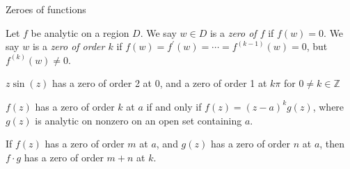 \documentclass{beamer}
\newcommand{\Z}{\mathbb{Z}}
\begin{document}
\begin{frame}{Zeroes of functions}
\begin{definition} Let $f$ be analytic on a region $D$.  We say $w\in D$ is a \emph{zero of $f$} if $f(w)=0$.  We say $w$ is a \emph{zero of order $k$} if $f(w)=f^\prime(w)=\cdots=f^{(k-1)}(w)=0$, but $f^{(k)}(w)\neq 0$.
\end{definition}
\begin{example}
$z\sin(z)$ has a zero of order 2 at 0, and a zero of order 1 at $k\pi$ for $0\neq k\in\Z$
\end{example}
\begin{lemma}
 $f(z)$ has a zero of order $k$ at $a$ if and only if $f(z)=(z-a)^kg(z)$, where $g(z)$ is analytic on nonzero on an open set containing $a$.
\end{lemma}
\begin{corollary}
If $f(z)$ has a zero of order $m$ at $a$, and $g(z)$ has a zero of order $n$ at $a$, then $f\cdot g$ has a zero of order $m+n$ at $k$.
\end{corollary}

\end{frame}
\end{document}
